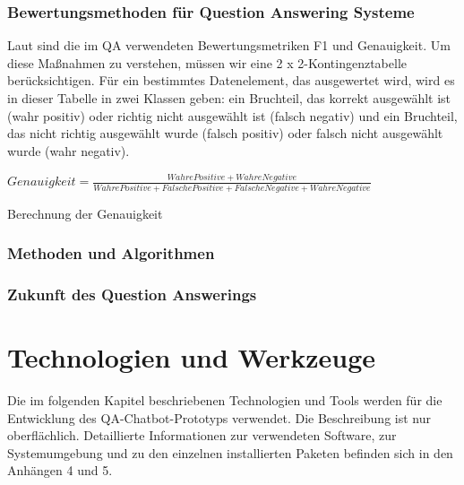 \documentclass[
        ngerman,
        paper=a4,
        numbers=noendperiod,
]{scrreprt}
\begin{document}
\subsection{Bewertungsmethoden für Question Answering Systeme}

Laut \citep{Yao2014FEATURE-DRIVENALIGNMENT} sind die im QA verwendeten Bewertungsmetriken F1 und Genauigkeit. Um diese Maßnahmen zu verstehen, müssen wir eine 2 x 2-Kontingenztabelle berücksichtigen. Für ein bestimmtes Datenelement, das ausgewertet wird, wird es in dieser Tabelle in zwei Klassen geben: ein Bruchteil, das korrekt ausgewählt ist (wahr positiv) oder richtig nicht ausgewählt ist (falsch negativ) und ein Bruchteil, das nicht richtig ausgewählt wurde (falsch positiv) oder falsch nicht ausgewählt wurde (wahr negativ). 

\begin{xequation-} 
\centering ${Genauigkeit}= \frac{Wahre Positive + Wahre Negative}{Wahre Positive + Falsche Positive + Falsche Negative + Wahre Negative}$
\caption[Berechnung der Genauigkeit]{Berechnung der Genauigkeit} 
    \label{eqn:genauigkeit}
\end{xequation-} 





\subsection{Methoden und Algorithmen}
\subsection{Zukunft des Question Answerings}



\chapter{Technologien und Werkzeuge}

Die im folgenden Kapitel beschriebenen Technologien und Tools werden für die Entwicklung des QA-Chatbot-Prototyps verwendet. Die Beschreibung ist nur oberflächlich. Detaillierte Informationen zur verwendeten Software, zur Systemumgebung und zu den einzelnen installierten Paketen befinden sich in den Anhängen 4 und 5. %
\end{document}
